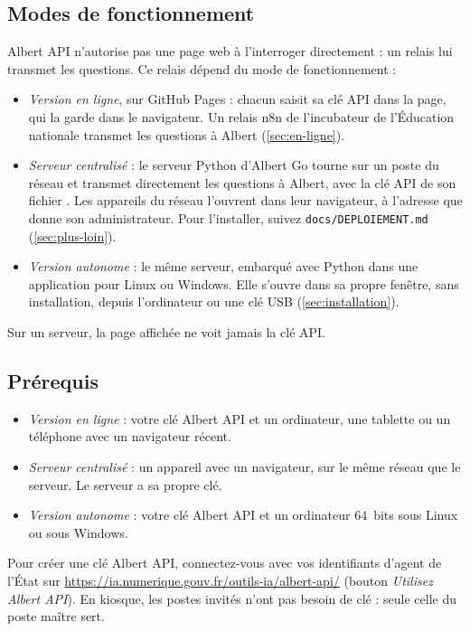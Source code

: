 \documentclass[a4paper, 11pt]{article}
\begin{document}
\subsection{Modes de fonctionnement}
\label{sec:modes}

Albert API n'autorise pas une page web à l'interroger directement : un relais lui transmet les questions. Ce relais dépend du mode de fonctionnement :
\begin{itemize}
  \item \emph{Version en ligne}, sur GitHub Pages : chacun saisit sa clé API dans la page, qui la garde dans le navigateur. Un relais n8n de l'incubateur de l'Éducation nationale transmet les questions à Albert (\autoref{sec:en-ligne}).
  \item \emph{Serveur centralisé} : le serveur Python d'Albert Go tourne sur un poste du réseau et transmet directement les questions à Albert, avec la clé API de son fichier . Les appareils du réseau l'ouvrent dans leur navigateur, à l'adresse que donne son administrateur. Pour l'installer, suivez \texttt{docs/DEPLOIEMENT.md} (\autoref{sec:plus-loin}).
  \item \emph{Version autonome} : le même serveur, embarqué avec Python dans une application pour Linux ou Windows. Elle s'ouvre dans sa propre fenêtre, sans installation, depuis l'ordinateur ou une clé USB (\autoref{sec:installation}).
\end{itemize}

Sur un serveur, la page affichée ne voit jamais la clé API.

\subsection{Prérequis}

\begin{itemize}
  \item \emph{Version en ligne} : votre clé Albert API et un ordinateur, une tablette ou un téléphone avec un navigateur récent.
  \item \emph{Serveur centralisé} : un appareil avec un navigateur, sur le même réseau que le serveur. Le serveur a sa propre clé.
  \item \emph{Version autonome} : votre clé Albert API et un ordinateur 64~bits sous Linux ou sous Windows.
\end{itemize}

Pour créer une clé Albert API, connectez-vous avec vos identifiants d'agent de l'État sur \url{https://ia.numerique.gouv.fr/outils-ia/albert-api/} (bouton \emph{Utilisez Albert API}). En kiosque, les postes invités n'ont pas besoin de clé : seule celle du poste maître sert.
\end{document}
